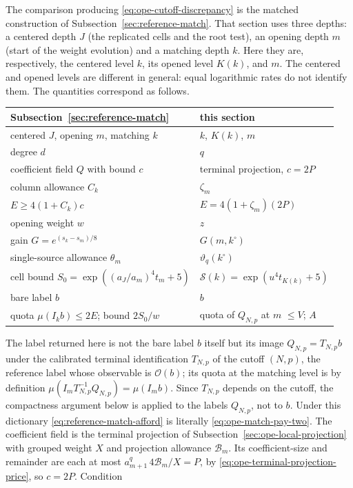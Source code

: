 The comparison producing \eqref{eq:ope-cutoff-discrepancy} is the
matched construction of Subsection~\ref{sec:reference-match}. That section uses three depths: a centered depth $J$ (the replicated cells and the
root test), an opening depth $m$ (start of the weight evolution) and a
matching depth $k$. Here they are, respectively, the centered level $k$,
its opened level $K(k)$, and $m$. The centered and opened levels are
different in general: equal logarithmic rates do not identify them.
The quantities correspond as follows.
\begin{center}
\begin{tabular}{ll}
Subsection~\ref{sec:reference-match} & this section\\ \hline
centered $J$, opening $m$, matching $k$ & $k$, $K(k)$, $m$\\
degree $d$ & $q$\\
coefficient field $Q$ with bound $c$ & terminal projection, $c=2P$\\
column allowance $C_k$ & $\zeta_m$\\
$E\geq4(1+C_k)c$ & $E=4(1+\zeta_m)(2P)$\\
opening weight $w$ & $z$\\
gain $G=e^{(s_k-s_m)/8}$ & $G(m,k^\circ)$\\
single-source allowance $\theta_m$ & $\vartheta_q(k^\circ)$\\
cell bound $S_0=\exp((a_J/a_m)^4t_m+5)$ & $\mathcal S(k)=\exp(u^4t_{K(k)}+5)$\\
bare label $b$ & $b$\\
quota $\mu(I_kb)\le2E$; bound $2S_0/w$ & quota of $Q_{N,p}$ at $m$ $\le V$; $A$
\end{tabular}
\end{center}
The label returned here is not the bare label $b$ itself but its image
$Q_{N,p}=T_{N,p}b$ under the calibrated terminal identification $T_{N,p}$
of the cutoff $(N,p)$, the reference label whose observable is
$\mathcal O(b)$; its quota at the matching level is by definition
$\mu(I_mT_{N,p}^{-1}Q_{N,p})=\mu(I_mb)$. Since $T_{N,p}$ depends on the
cutoff, the compactness argument below is applied to the labels
$Q_{N,p}$, not to $b$. Under this dictionary
\eqref{eq:reference-match-afford} is literally
\eqref{eq:ope-match-pay-two}. The coefficient field is the terminal
projection of Subsection~\ref{sec:ope-local-projection} with grouped weight
$X$ and projection allowance $\mathcal B_m$. Its coefficient-size and
remainder are each at most $a_{m+1}^q\,4\mathcal B_m/X=P$, by
\eqref{eq:ope-terminal-projection-price}, so $c=2P$. Condition
